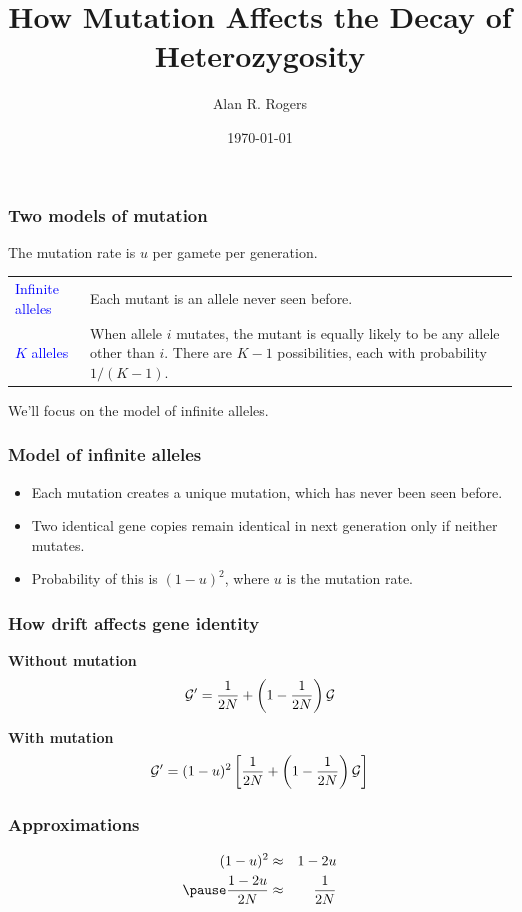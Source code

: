 \title{How Mutation Affects the Decay of Heterozygosity}
\author{Alan R. Rogers}
\date{\today}
\frame{\titlepage}

\begin{frame}
\frametitle{Two models of mutation}
The mutation rate is $u$ per gamete per generation.
\begin{center}
\begin{tabular}{lp{}}
\textcolor{blue}{Infinite alleles} & Each mutant is an allele
  never seen before.\\[1ex]
\textcolor{blue}{$K$ alleles}      & When allele $i$ mutates, the
mutant is equally likely to be any allele other than $i$. There are
$K-1$ possibilities, each with probability $1/(K-1)$. 
\end{tabular}
\end{center}
We'll focus on the model of infinite alleles.
\end{frame}

\begin{frame}
\frametitle{Model of infinite alleles}
\begin{itemize}
\item Each mutation creates a unique mutation, which has never been
  seen before.
\item Two identical gene copies remain identical in next generation
  only if neither mutates.
\item Probability of this is $(1-u)^2$, where $u$ is the mutation
  rate.
\end{itemize}
\end{frame}

\begin{frame}
\frametitle{How drift affects gene identity} 

\textbf{Without mutation}
\[
\mathcal{G}' = \frac{1}{2N} + \left(1 - \frac{1}{2N}\right) \mathcal{G}
\]

\pause
\textbf{With mutation}
\[
\mathcal{G}' = (1-u)^2\left[\frac{1}{2N} + \left(1 - \frac{1}{2N}\right) \mathcal{G}\right]
\]
\end{frame}

\begin{frame}
\frametitle{Approximations}
\begin{eqnarray*}
(1-u)^2 & \approx & 1-2u\\
\pause
\frac{1-2u}{2N} & \approx & \frac{1}{2N}
\end{eqnarray*}
\end{frame}

